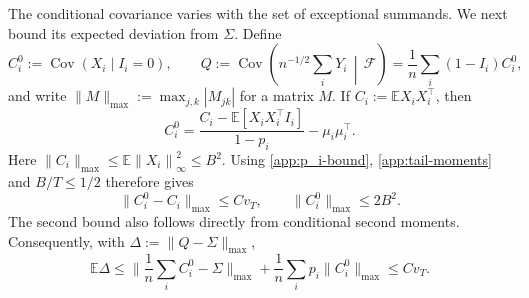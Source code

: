 \documentclass[11pt,letterpaper]{article}
\theoremstyle{remark}
\newcommand{\E}{\mathbb E}
\newcommand{\Cov}{\operatorname{Cov}}
\newcommand{\norm}[1]{\left\lVert#1\right\rVert}
\newcommand{\maxnorm}[1]{\lVert#1\rVert_{\max}}
\begin{document}
The conditional covariance varies with the set of exceptional {summands}.
We next bound its expected deviation from \(\Sigma\). {Define}
\[
 C_i^0:=\Cov(X_i\mid I_i=0),\qquad
 Q:=\Cov\left(n^{-1/2}\sum_iY_i\,\middle|\,\mathcal F\right)
   =\frac1n\sum_i(1-I_i)C_i^0,
\]
and write \(\maxnorm M:=\max_{j,k}|M_{jk}|\) for a matrix \(M\).
If \(C_i:=\E X_iX_i^\top\), then
\[
 C_i^0=\frac{C_i-\E[X_iX_i^\top I_i]}{1-p_i}
          -\mu_i\mu_i^\top.
\]
Here \(\maxnorm{C_i}\le\E\norm{X_i}_\infty^2\le B^2\).
{
Using \eqref{app:p_i-bound}, \eqref{app:tail-moments} and $B/T\leq1/2$ therefore gives
}
\[
 \maxnorm{C_i^0-C_i}\le C v_T,
 \qquad \maxnorm{C_i^0}\le2B^2.
\]
The second bound also follows directly from conditional second moments.
Consequently, with \(\Delta:=\maxnorm{Q-\Sigma}\),
\begin{equation}
 \E\Delta
 \le\maxnorm{\frac1n\sum_i C_i^0-\Sigma}
       +\frac1n\sum_i p_i\maxnorm{C_i^0}
 \le C v_T.
 \label{app:conditional-covariance}
\end{equation}
\end{document}
